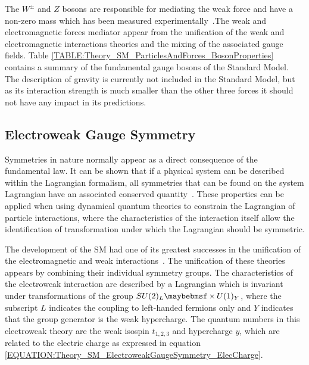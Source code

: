 The $W^{\pm}$ and $Z$ bosons are responsible for mediating the weak force and have a non-zero mass which has been measured experimentally~\cite{ARTICLE:TEVATRONcombinedWmass,ARTICLE:DELPHIMassZ,ARTICLE:PDG2014}.The weak and electromagnetic forces mediator appear from the unification of the weak and electromagnetic interactions theories and the mixing of the associated gauge fields. Table \ref{TABLE:Theory_SM_ParticlesAndForces_BosonProperties} contains a summary of the fundamental gauge bosons of the Standard Model. The description of gravity is currently not included in the Standard Model, but as its interaction strength is much smaller than the other three forces it should not have any impact in its predictions.



\subsection{Electroweak Gauge Symmetry}
\label{SUBSECTION:Theory_SM_ElectroweakGaugeSymmetry}


Symmetries in nature normally appear as a direct consequence of the fundamental law. It can be shown that if a physical system can be described within the Lagrangian formalism, all symmetries that can be found on the system Lagrangian have an associated conserved quantity~\cite{ARTICLE:InvariantVariationProblems}. These properties can be applied when using dynamical quantum theories to constrain the Lagrangian of particle interactions, where the characteristics of the interaction itself allow the identification of transformation under which the Lagrangian should be symmetric.

The development of the \gls{SM} had one of its greatest successes in the unification of the electromagnetic and weak interactions~\cite{ARTICLE:Glashow,ARTICLE:Weinberg,ARTICLE:Salam}. The unification of these theories appears by combining their individual symmetry groups. The characteristics of the electroweak interaction are described by a Lagrangian which is invariant under transformations of the group $\sutwol\times\uone$, where the subscript $L$ indicates the coupling to left-handed fermions only and $Y$ indicates that the group generator is the weak hypercharge. The quantum numbers in this electroweak theory are the weak isospin $t_{1,2,3}$ and hypercharge $y$, which are related to the electric charge as expressed in equation \ref{EQUATION:Theory_SM_ElectroweakGaugeSymmetry_ElecCharge}.

